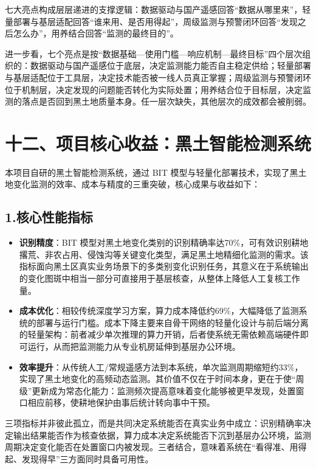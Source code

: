 七大亮点构成层层递进的支撑逻辑：数据驱动与国产遥感回答“数据从哪里来”，轻量部署与基层适配回答“谁来用、是否用得起”，周级监测与预警闭环回答“发现之后怎么办”，用养结合回答“监测的最终目的”。

进一步看，七个亮点是按“数据基础—使用门槛—响应机制—最终目标”四个层次组织的：数据驱动与国产遥感位于底层，决定监测能力能否自主稳定供给；轻量部署与基层适配位于工具层，决定技术能否被一线人员真正掌握；周级监测与预警闭环位于机制层，决定发现的问题能否转化为实际处置；用养结合位于目标层，决定监测的落点是否回到黑土地质量本身。任一层次缺失，其他层次的成效都会被削弱。

\section{十二、项目核心收益：黑土智能检测系统}

本项目自研的黑土智能检测系统，通过 BIT 模型与轻量化部署技术，实现了黑土地变化监测的效率、成本与精度的三重突破，核心成果与收益如下：

\subsection{1.核心性能指标}

\begin{itemize}
  \item \textbf{识别精度}：BIT 模型对黑土地变化类别的识别精确率达70\%，可有效识别耕地撂荒、非农占用、侵蚀沟等关键变化类型，满足黑土地精细化监测的需求。该指标面向黑土区真实业务场景下的多类别变化识别任务，其意义在于系统输出的变化图斑中相当一部分可直接用于基层核查，从整体上降低人工复核工作量。
  \item \textbf{成本优化}：相较传统深度学习方案，算力成本降低约69\%，大幅降低了监测系统的部署与运行门槛。成本下降主要来自骨干网络的轻量化设计与前后端分离的轻量架构：前者减少单次推理的算力开销，后者使系统无需依赖高端硬件即可运行，从而把监测能力从专业机房延伸到基层办公环境。
  \item \textbf{效率提升}：从传统人工/常规遥感方法到本系统，单次监测周期缩短约33\%，实现了黑土地变化的高频动态监测。其价值不仅在于时间本身，更在于使“周级”更新成为常态化能力：监测频次提高意味着变化能够被更早发现，处置窗口相应前移，使耕地保护由事后统计转向事中干预。
\end{itemize}

三项指标并非彼此孤立，而是共同决定系统能否在真实业务中成立：识别精确率决定输出结果能否作为核查依据，算力成本决定系统能否下沉到基层办公环境，监测周期决定变化能否在处置窗口内被发现。三者结合，意味着系统在“看得准、用得起、发现得早”三方面同时具备可用性。

